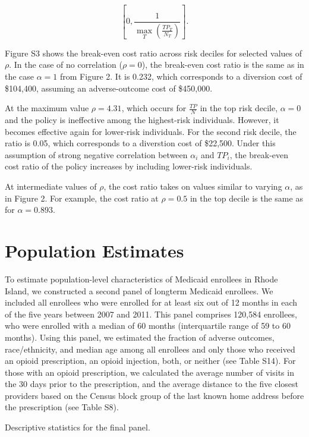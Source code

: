 \documentclass[9pt,twoside]{pnas-new}
\begin{document}
\[ \left[0, \frac{1}{\max\limits_{T} \left( \frac{TP_T}{N_T} \right)}\right]. \]

Figure S3 shows the break-even cost ratio across risk deciles for selected values of $\rho$. In the case of no correlation ($\rho=0$), the break-even cost ratio is the same as in the case $\alpha = 1$ from Figure 2. It is 0.232, which corresponds to a diversion cost of \$104,400, assuming an adverse-outcome cost of \$450,000.

At the maximum value $\rho = 4.31$, which occurs for $\frac{TP}{N}$ in the top risk decile, $\alpha = 0$ and the policy is ineffective among the highest-risk individuals. However, it becomes effective again for lower-risk individuals. For the second risk decile, the ratio is 0.05, which corresponds to a diverstion cost of \$22,500. Under this assumption of strong negative correlation between $\alpha_i$ and $TP_i$, the break-even cost ratio of the policy increases by including lower-risk individuals.

At intermediate values of $\rho$, the cost ratio takes on values similar to varying $\alpha$, as in Figure 2. For example, the cost ratio at $\rho=0.5$ in the top decile is the same as for $\alpha = 0.893$. 

\section{Population Estimates}

To estimate population-level characteristics of Medicaid enrollees in Rhode Island, we constructed a second panel of longterm Medicaid enrollees. We included all enrollees who were enrolled for at least six out of 12 months in each of the five years between 2007 and 2011. This panel comprises 120,584 enrollees, who were enrolled with a median of 60 months (interquartile range of 59 to 60 months). Using this panel, we estimated the fraction of adverse outcomes, race/ethnicity, and median age among all enrollees and only those who received an opioid prescription, an opioid injection, both, or neither (see Table S14). For those with an opioid prescription, we calculated the average number of visits in the 30 days prior to the prescription, and the average distance to the five closest providers based on the Census block group of the last known home address before the prescription (see Table S8).

\footnotesize

\normalsize

\begin{table}
\caption{Descriptive statistics for the final panel.}
\centering

\end{table}
\end{document}

